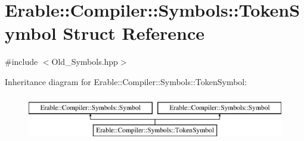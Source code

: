 \hypertarget{class_erable_1_1_compiler_1_1_symbols_1_1_token_symbol}{}\section{Erable\+::Compiler\+::Symbols\+::Token\+Symbol Struct Reference}
\label{class_erable_1_1_compiler_1_1_symbols_1_1_token_symbol}


{\ttfamily \#include $<$Old\+\_\+\+Symbols.\+hpp$>$}

Inheritance diagram for Erable\+::Compiler\+::Symbols\+::Token\+Symbol\+:\begin{figure}[H]
\begin{center}
\leavevmode
\includegraphics[height=2.000000cm]{class_erable_1_1_compiler_1_1_symbols_1_1_token_symbol}
\end{center}
\end{figure}
